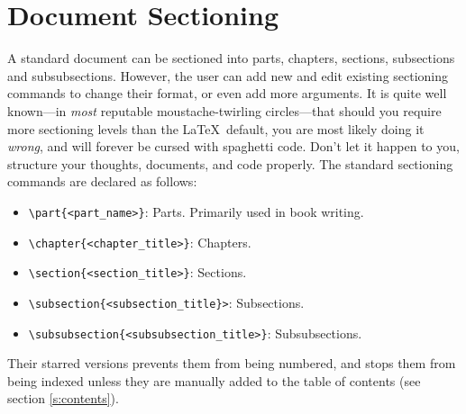 \section{Document Sectioning}
%
A standard document can be sectioned into parts, chapters, sections, subsections and subsubsections. However, the user can add new and edit existing sectioning commands to change their format, or even add more arguments. It is quite well known---in \emph{most} reputable moustache-twirling circles---that should you require more sectioning levels than the \LaTeX~default, you are most likely doing it \emph{wrong}, and will forever be cursed with spaghetti code. Don't let it happen to you, structure your thoughts, documents, and code properly. The standard sectioning commands are declared as follows:
\begin{itemize}
	\item \verb|\part{<part_name>}|: Parts. Primarily used in book writing.
	\item \verb|\chapter{<chapter_title>}|: Chapters.
	\item \verb|\section{<section_title>}|: Sections.
	\item \verb|\subsection{<subsection_title}>|: Subsections.
	\item \verb|\subsubsection{<subsubsection_title>}|: Subsubsections.
\end{itemize}
Their starred versions prevents them from being numbered, and stops them from being indexed unless they are manually added to the table of contents (see section \ref{s:contents}).
%